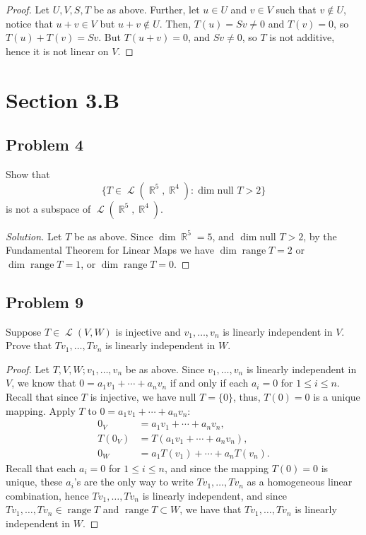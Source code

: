 \documentclass[letterpaper, 12pt]{amsart}
\DeclareMathOperator{\R}{\mathbb{R}}
\renewcommand{\null}{\text{null }}
\DeclareMathOperator{\range}{\text{range }}
\DeclareMathOperator{\Ell}{\mathscr{L}}
\theoremstyle{definition}  %
\begin{document}
		\begin{proof}
		Let $U,V,S,T$ be as above.
		Further, let $u \in U$ and $v \in V$ such that $v \notin U$, notice that $u+v \in V$ but $u+v \notin U$.
		Then, $T(u) = Sv \neq 0$ and $T(v) = 0$, so $T(u) + T(v) = Sv$.
		But $T(u+v) = 0$, and $Sv \neq 0$, so $T$ is not additive, hence it is not linear on $V$.
		\end{proof}

	\section*{Section 3.B}
		\subsection*{Problem 4}
		Show that $$\{ T \in \Ell(\R^{5}, \R^{4}) : \dim \null T > 2 \}$$ is not a subspace of $\Ell(\R^{5}, \R^{4})$.

		\begin{proof}[Solution]
		Let $T$ be as above.
		Since $\dim \R^{5} = 5$, and $\dim \null T > 2$, by the Fundamental Theorem for Linear Maps we have $\dim \range T = 2$ or $\dim \range T = 1$, or $\dim \range T = 0$.
		\end{proof}

		\subsection*{Problem 9}
		Suppose $T \in \Ell(V,W)$ is injective and $v_{1}, \dots, v_{n}$ is linearly independent in $V$.
		Prove that $Tv_{1}, \dots, Tv_{n}$ is linearly independent in $W$.

		\begin{proof}
		Let $T, V, W; v_{1}, \dots, v_{n}$ be as above.
		Since $v_{1}, \dots, v_{n}$ is linearly independent in $V$, we know that $0 = a_{1}v_{1} + \cdots + a_{n}v_{n}$ if and only if each $a_{i} = 0$ for $1 \leq i \leq n$.
		Recall that since $T$ is injective, we have $\null T = \{ 0 \}$, thus, $T(0) = 0$ is a unique mapping.
		Apply $T$ to $0 = a_{1}v_{1} + \cdots + a_{n}v_{n}$:
			\begin{align*}
				0_{V} &= a_{1}v_{1} + \cdots + a_{n}v_{n}, \\
				T(0_{V}) &= T(a_{1}v_{1} + \cdots + a_{n}v_{n}), \\
				0_{W} &= a_{1}T(v_{1}) + \cdots + a_{n}T(v_{n}).
			\end{align*}
		Recall that each $a_{i} = 0$ for $1 \leq i \leq n$, and since the mapping $T(0)=0$ is unique, these $a_{i}$'s are the only way to write $Tv_{1}, \dots, Tv_{n}$ as a homogeneous linear combination, hence $Tv_{1}, \dots, Tv_{n}$ is linearly independent, and since $Tv_{1}, \dots, Tv_{n} \in \range T$ and $\range T \subset W$, we have that $Tv_{1}, \dots, Tv_{n}$ is linearly independent in $W$.
		\end{proof}
\end{document}
